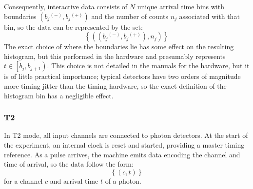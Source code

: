 \documentclass{article}
\newcommand{\braces}[1]{\ensuremath{\left\lbrace #1 \right\rbrace}}
\newcommand{\angles}[1]{\ensuremath{\left\langle #1 \right\rangle}}
\newcommand{\parens}[1]{\ensuremath{\left( #1 \right)}}
\newcommand{\gn}[1]{\ensuremath{g^{(#1)}}}
\newcommand{\upplus}{\ensuremath{^{(+)}}}
\newcommand{\upminus}{\ensuremath{^{(-)}}}
\begin{document}
Consequently, interactive data consists of $N$ unique arrival time bins with boundaries $\parens{b_{j}\upminus, b_{j}\upplus}$ and the number of counts $n_{j}$ associated with that bin, so the data can be represented by the set:
\begin{equation}
\braces{\parens{\parens{b_{j}\upminus, b_{j}\upplus}, n_{j}}}
\end{equation}
The exact choice of where the boundaries lie has some effect on the resulting histogram, but this performed in the hardware and presumably represents $t\in\left[b_{j}, b_{j+1}\right)$. This choice is not detailed in the manuals for the hardware, but it is of little practical importance; typical detectors have two orders of magnitude more timing jitter than the timing hardware, so the exact definition of the histogram bin has a negligible effect.

\subsubsection{T2}
In T2 mode, all input channels are connected to photon detectors. At the start of the experiment, an internal clock is reset and started, providing a master timing reference. As a pulse arrives, the machine emits data encoding the channel and time of arrival, so the data follow the form:
\begin{equation}
\braces{(c, t)}
\end{equation}
for a channel $c$ and arrival time $t$ of a photon.
\end{document}
